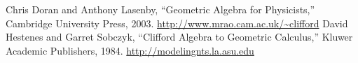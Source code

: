 \documentclass[10pt]{article}
\begin{document}
\begin{thebibliography}{99}
 Chris Doran and Anthony Lasenby, ``Geometric Algebra for Physicists,'' Cambridge University
Press, 2003. \url{http://www.mrao.cam.ac.uk/~clifford}
 David Hestenes and Garret Sobczyk, ``Clifford Algebra to Geometric Calculus,'' Kluwer Academic
Publishers, 1984. \url{http://modelingnts.la.asu.edu}
\end{thebibliography}
\end{document}
